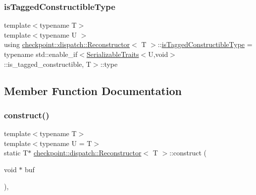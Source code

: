 \mbox{\label{structcheckpoint_1_1dispatch_1_1_reconstructor_a59b6cbc4d45b5b293cbd1cd622ba86f9}} 
\subsubsection{\texorpdfstring{is\+Tagged\+Constructible\+Type}{isTaggedConstructibleType}}
{\footnotesize\ttfamily template$<$typename T$>$ \\
template$<$typename U $>$ \\
using \hyperlink{structcheckpoint_1_1dispatch_1_1_reconstructor}{checkpoint\+::dispatch\+::\+Reconstructor}$<$ T $>$\+::\hyperlink{structcheckpoint_1_1dispatch_1_1_reconstructor_a59b6cbc4d45b5b293cbd1cd622ba86f9}{is\+Tagged\+Constructible\+Type} =  typename std\+::enable\+\_\+if$<$\hyperlink{structcheckpoint_1_1_serializable_traits}{Serializable\+Traits}$<$U,void$>$\+::is\+\_\+tagged\+\_\+constructible, T$>$\+::type}



\subsection{Member Function Documentation}
\mbox{\label{structcheckpoint_1_1dispatch_1_1_reconstructor_a31a927731c0b265003a416e8d20616a1}} 
\subsubsection{\texorpdfstring{construct()}{construct()}}
{\footnotesize\ttfamily template$<$typename T$>$ \\
template$<$typename U  = T$>$ \\
static T$\ast$ \hyperlink{structcheckpoint_1_1dispatch_1_1_reconstructor}{checkpoint\+::dispatch\+::\+Reconstructor}$<$ T $>$\+::construct (\begin{DoxyParamCaption}\item[{void $\ast$}]{buf }\end{DoxyParamCaption})\hspace{0.3cm}{\ttfamily [inline]}, {\ttfamily [static]}}


